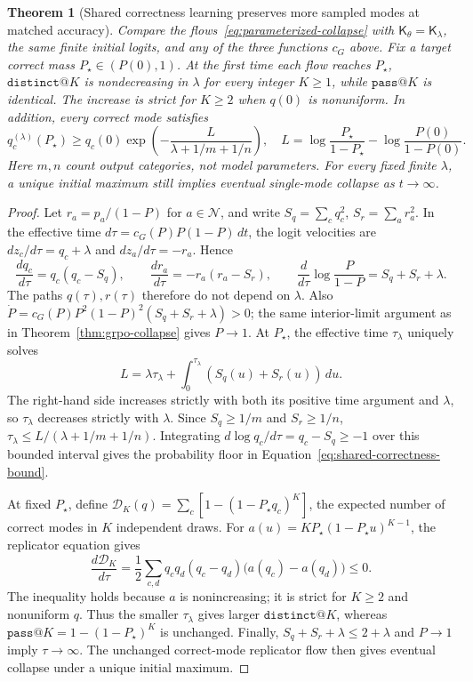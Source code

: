 \documentclass{article}
\newcommand{\1}{\mathbf 1}
\newtheorem{theorem}[lemma]{Theorem}
\theoremstyle{remark}
\theoremstyle{definition}
\theoremstyle{plain}
\begin{document}
\begin{theorem}[Shared correctness learning preserves more sampled modes at matched accuracy]
\label{thm:shared-correctness}
Compare the flows~\eqref{eq:parameterized-collapse} with
$\mathsf K_\theta=\mathsf K_\lambda$, the same finite initial logits, and any
of the three functions $c_G$ above. Fix a target correct mass
$P_\star\in(P(0),1)$. At the first time each flow reaches $P_\star$,
$\texttt{distinct@}K$ is nondecreasing in $\lambda$ for every integer $K\ge1$,
while $\texttt{pass@}K$ is identical. The increase is strict for $K\ge2$ when
$q(0)$ is nonuniform. In addition, every correct mode satisfies
\begin{equation}
 q_c^{(\lambda)}(P_\star)
 \ge q_c(0)\exp\!\left(-\frac{L}{\lambda+1/m+1/n}\right),
 \quad
 L=\log\frac{P_\star}{1-P_\star}-\log\frac{P(0)}{1-P(0)}.
 \label{eq:shared-correctness-bound}
\end{equation}
Here $m,n$ count output categories, not model parameters. For every fixed
finite $\lambda$, a unique initial maximum still implies eventual
single-mode collapse as $t\to\infty$.
\end{theorem}

\begin{proof}
Let $r_a=p_a/(1-P)$ for $a\in\mathcal N$, and write
$S_q=\sum_cq_c^2$, $S_r=\sum_ar_a^2$. In the effective time
$d\tau=c_G(P)P(1-P)\,dt$, the logit velocities are
$dz_c/d\tau=q_c+\lambda$ and $dz_a/d\tau=-r_a$. Hence
\begin{equation}
 \frac{dq_c}{d\tau}=q_c(q_c-S_q),\qquad
 \frac{dr_a}{d\tau}=-r_a(r_a-S_r),\qquad
 \frac{d}{d\tau}\log\frac{P}{1-P}=S_q+S_r+\lambda.
 \label{eq:shared-correctness-clock}
\end{equation}
The paths $q(\tau),r(\tau)$ therefore do not depend on $\lambda$.
Also $\dot P=c_G(P)P^2(1-P)^2(S_q+S_r+\lambda)>0$; the same interior-limit
argument as in Theorem~\ref{thm:grpo-collapse} gives $P\to1$.
At $P_\star$, the effective time $\tau_\lambda$ uniquely solves
\[
 L=\lambda\tau_\lambda+
   \int_0^{\tau_\lambda}(S_q(u)+S_r(u))\,du.
\]
The right-hand side increases strictly with both its positive time argument
and $\lambda$, so $\tau_\lambda$ decreases strictly with $\lambda$.
Since $S_q\ge1/m$ and $S_r\ge1/n$,
$\tau_\lambda\le L/(\lambda+1/m+1/n)$. Integrating
$d\log q_c/d\tau=q_c-S_q\ge-1$ over this bounded interval gives the probability
floor in Equation~\eqref{eq:shared-correctness-bound}.

At fixed $P_\star$, define
$\mathcal D_K(q)=\sum_c[1-(1-P_\star q_c)^K]$, the expected number of correct modes in
$K$ independent draws. For
$a(u)=KP_\star(1-P_\star u)^{K-1}$, the replicator equation gives
\[
 \frac{d\mathcal D_K}{d\tau}
 =\frac12\sum_{c,d}q_cq_d(q_c-q_d)\bigl(a(q_c)-a(q_d)\bigr)\le0.
\]
The inequality holds because $a$ is nonincreasing; it is strict for $K\ge2$
and nonuniform $q$. Thus the smaller $\tau_\lambda$ gives larger
$\texttt{distinct@}K$, whereas
$\texttt{pass@}K=1-(1-P_\star)^K$ is unchanged. Finally,
$S_q+S_r+\lambda\le2+\lambda$ and $P\to1$ imply $\tau\to\infty$.
The unchanged correct-mode replicator flow then gives eventual collapse
under a unique initial maximum.
\end{proof}
\end{document}
